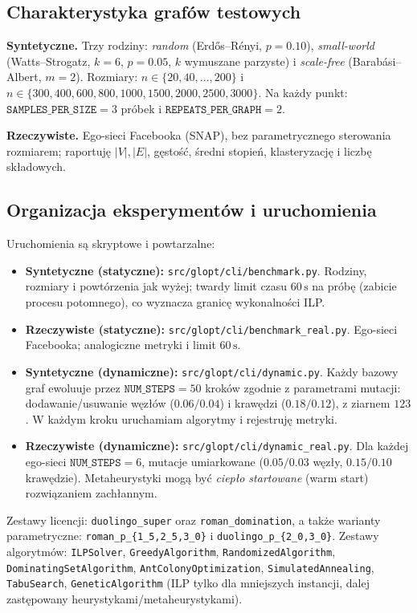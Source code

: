 \subsection{Charakterystyka grafów testowych}

\textbf{Syntetyczne.} Trzy rodziny: \textit{random} (Erdős–Rényi, $p=0{.}10$), \textit{small-world} (Watts–Strogatz, $k=6$, $p=0{.}05$, $k$ wymuszane parzyste) i \textit{scale-free} (Barabási–Albert, $m=2$). Rozmiary: \(n\in\{20,40,\dots,200\}\) i \(n\in\{300,400,600,800,1000,1500,2000,2500,3000\}\). Na każdy punkt: \(\texttt{SAMPLES\_PER\_SIZE}=3\) próbek i \(\texttt{REPEATS\_PER\_GRAPH}=2\).

\textbf{Rzeczywiste.} Ego-sieci Facebooka (SNAP), bez parametrycznego sterowania rozmiarem; raportuję \(|V|,|E|\), gęstość, średni stopień, klasteryzację i liczbę składowych.


\subsection{Organizacja eksperymentów i uruchomienia}\label{subsec:uruchomienia}
Uruchomienia są skryptowe i powtarzalne:
\begin{itemize}
  \item \textbf{Syntetyczne (statyczne):} \texttt{src/glopt/cli/benchmark.py}. Rodziny, rozmiary i powtórzenia jak wyżej; twardy limit czasu \(60\,\mathrm{s}\) na próbę (zabicie procesu potomnego), co wyznacza granicę wykonalności ILP.
  \item \textbf{Rzeczywiste (statyczne):} \texttt{src/glopt/cli/benchmark\_real.py}. Ego-sieci Facebooka; analogiczne metryki i limit \(60\,\mathrm{s}\).
  \item \textbf{Syntetyczne (dynamiczne):} \texttt{src/glopt/cli/dynamic.py}. Każdy bazowy graf ewoluuje przez \(\texttt{NUM\_STEPS}=50\) kroków zgodnie z parametrami mutacji: dodawanie/usuwanie węzłów (\(0{.}06/0{.}04\)) i krawędzi (\(0{.}18/0{.}12\)), z ziarnem \(123\). W każdym kroku uruchamiam algorytmy i rejestruję metryki.
  \item \textbf{Rzeczywiste (dynamiczne):} \texttt{src/glopt/cli/dynamic\_real.py}. Dla każdej ego-sieci \(\texttt{NUM\_STEPS}=6\), mutacje umiarkowane (\(0{.}05/0{.}03\) węzły, \(0{.}15/0{.}10\) krawędzie). Metaheurystyki mogą być \emph{ciepło startowane} (warm start) rozwiązaniem zachłannym.
\end{itemize}

\noindent Zestawy licencji: \texttt{duolingo\_super} oraz \texttt{roman\_domination}, a także warianty parametryczne: \texttt{roman\_p\_\{1\_5,2\_5,3\_0\}} i \texttt{duolingo\_p\_\{2\_0,3\_0\}}. Zestawy algorytmów: \texttt{ILPSolver}, \texttt{GreedyAlgorithm}, \texttt{RandomizedAlgorithm}, \texttt{DominatingSetAlgorithm}, \texttt{AntColonyOptimization}, \texttt{SimulatedAnnealing}, \texttt{TabuSearch}, \texttt{GeneticAlgorithm} (ILP tylko dla mniejszych instancji, dalej zastępowany heurystykami/metaheurystykami).


